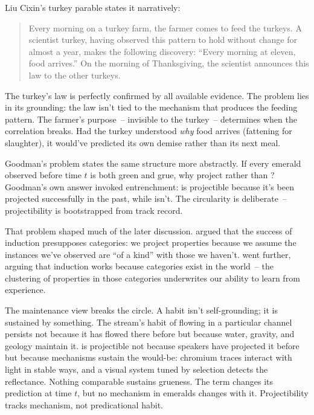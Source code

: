 Liu Cixin's turkey parable states it narratively:

\begin{quote}
Every morning on a turkey farm, the farmer comes to feed the turkeys. A scientist turkey, having observed this pattern to hold without change for almost a year, makes the following discovery: \enquote{Every morning at eleven, food arrives.} On the morning of Thanksgiving, the scientist announces this law to the other turkeys. \citep[ch.~6]{liu2008}
\end{quote}

The turkey's law is perfectly confirmed by all available evidence. The problem lies in its grounding: the law isn't tied to the mechanism that produces the feeding pattern. The farmer's purpose~-- invisible to the turkey~-- determines when the correlation breaks. Had the turkey understood \emph{why} food arrives (fattening for slaughter), it would've predicted its own demise rather than its next meal.

Goodman's  problem states the same structure more abstractly. If every emerald observed before time $t$ is both green and grue, why project  rather than ? Goodman's own answer invoked entrenchment:  is projectible because it's been projected successfully in the past, while  isn't. The circularity is deliberate~-- projectibility is bootstrapped from track record.

That problem shaped much of the later discussion. \textcite{quine1969} argued that the success of induction presupposes categories: we project properties because we assume the instances we've observed are \enquote{of a kind} with those we haven't. \textcite{kornblith1993} went further, arguing that induction works because categories exist in the world~-- the clustering of properties in those categories underwrites our ability to learn from experience.

The maintenance view breaks the circle. A habit isn't self-grounding; it is sustained by something. The stream's habit of flowing in a particular channel persists not because it has flowed there before but because water, gravity, and geology maintain it.  is projectible not because speakers have projected it before but because mechanisms sustain the would-be: chromium traces interact with light in stable ways, and a visual system tuned by selection detects the reflectance. Nothing comparable sustains grueness. The term changes its prediction at time $t$, but no mechanism in emeralds changes with it. Projectibility tracks mechanism, not predicational habit.

